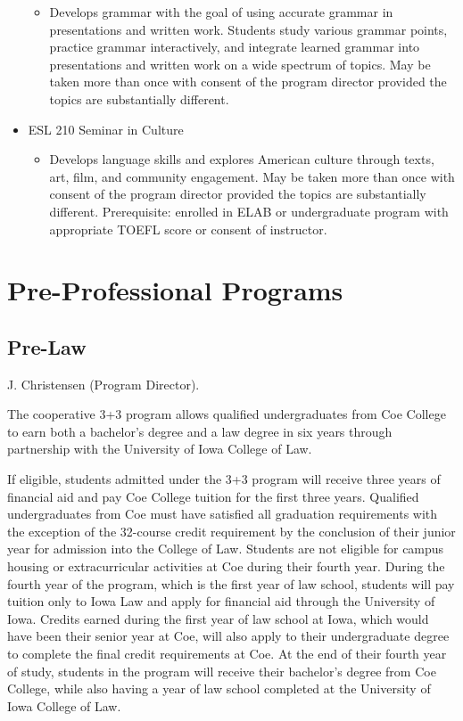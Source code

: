 \documentclass[
  letterpaper,
]{scrbook}
\providecommand{\tightlist}{%
  \setlength{\itemsep}{0pt}\setlength{\parskip}{0pt}}
\begin{document}
\begin{itemize}
  \begin{itemize}
  \tightlist
  \item
    Develops grammar with the goal of using accurate grammar in
    presentations and written work. Students study various grammar
    points, practice grammar interactively, and integrate learned
    grammar into presentations and written work on a wide spectrum of
    topics. May be taken more than once with consent of the program
    director provided the topics are substantially different.
  \end{itemize}
\item
  ESL 210 Seminar in Culture

  \begin{itemize}
  \tightlist
  \item
    Develops language skills and explores American culture through
    texts, art, film, and community engagement. May be taken more than
    once with consent of the program director provided the topics are
    substantially different. Prerequisite: enrolled in ELAB or
    undergraduate program with appropriate TOEFL score or consent of
    instructor.
  \end{itemize}
\end{itemize}

\section{Pre-Professional Programs}\label{pre-professional-programs}

\subsection{Pre-Law}\label{pre-law}

J. Christensen (Program Director).

The cooperative 3+3 program allows qualified undergraduates from Coe
College to earn both a bachelor's degree and a law degree in six years
through partnership with the University of Iowa College of Law.

If eligible, students admitted under the 3+3 program will receive three
years of financial aid and pay Coe College tuition for the first three
years. Qualified undergraduates from Coe must have satisfied all
graduation requirements with the exception of the 32-course credit
requirement by the conclusion of their junior year for admission into
the College of Law. Students are not eligible for campus housing or
extracurricular activities at Coe during their fourth year. During the
fourth year of the program, which is the first year of law school,
students will pay tuition only to Iowa Law and apply for financial aid
through the University of Iowa. Credits earned during the first year of
law school at Iowa, which would have been their senior year at Coe, will
also apply to their undergraduate degree to complete the final credit
requirements at Coe. At the end of their fourth year of study, students
in the program will receive their bachelor's degree from Coe College,
while also having a year of law school completed at the University of
Iowa College of Law.
\end{document}
